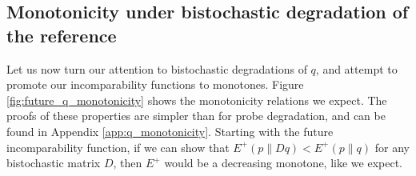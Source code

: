 \subsection{Monotonicity under bistochastic degradation of the reference} \label{sec:q_monotonicity}

Let us now turn our attention to bistochastic degradations of $q$, and attempt to promote our incomparability functions to monotones. Figure \ref{fig:future_q_monotonicity} shows the monotonicity relations we expect. The proofs of these properties are simpler than for probe degradation, and can be found in Appendix \ref{app:q_monotonicity}. Starting with the future incomparability function, if we can show that $E^+(p \parallel Dq) < E^+(p \parallel q)$ for any bistochastic matrix $D$, then $E^+$ would be a decreasing monotone, like we expect.

